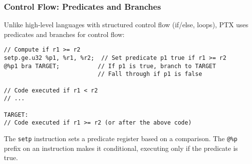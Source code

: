 \subsubsection{Control Flow: Predicates and Branches}

Unlike high-level languages with structured control flow (if/else, loops), PTX uses predicates and branches for control flow:

\begin{lstlisting}[style=ptx]
// Compute if r1 >= r2
setp.ge.u32 %p1, %r1, %r2;  // Set predicate p1 true if r1 >= r2
@%p1 bra TARGET;           // If p1 is true, branch to TARGET
                           // Fall through if p1 is false

// Code executed if r1 < r2
// ...

TARGET:
// Code executed if r1 >= r2 (or after the above code)
\end{lstlisting}

The \texttt{setp} instruction sets a predicate register based on a comparison. The \texttt{@\%p} prefix on an instruction makes it conditional, executing only if the predicate is true.

